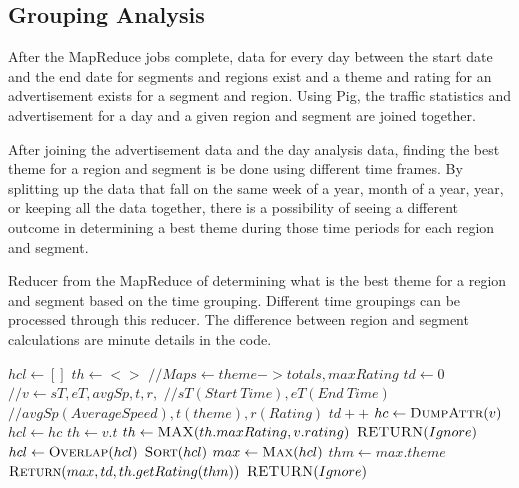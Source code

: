 \documentclass[titlepage,twocolumn]{article}
\begin{document}
\subsection{Grouping Analysis}
\label{sub:grpAnalysis}

\par After the MapReduce jobs complete, data for every day between the start date and the end date for segments and regions exist and a theme and rating for an advertisement exists for a segment and region. Using Pig, the traffic statistics and advertisement for a day and a given region and segment are joined together. 

\par After joining the advertisement data and the day analysis data, finding the best theme for a region and segment is be done using different time frames. By splitting up the data that fall on the same week of a year, month of a year, year, or keeping all the data together, there is a possibility of seeing a different outcome in determining a best theme during those time periods for each region and segment. 

\begin{algorithm}
	\small
	\caption{\small Reducer from the MapReduce of determining what is the best theme for a region and segment based on the time grouping. Different time groupings can be processed through this reducer. The difference between region and segment calculations are minute details in the code.}
	\label{alg:5}
	\begin{algorithmic}[1]
		\State $ hcl \gets [] $ 
		\State $ th \gets <> $ 
		\State $ // Maps \gets theme -> totals, maxRating $
		\State $ td \gets 0 $ 
			\State $ // v \gets sT, eT, avgSp, t, r, $
			\State $ // sT (Start\ Time), eT (End\ Time) $
			\State $ // avgSp (Average Speed), t (theme), r (Rating) $
			\State $ td++ $
				\State $ hc \gets \Call{DumpAttr}{v} $
				\State $ hcl \gets hc $
				\State $ th \gets v.t $
				\State $ th \gets \Call{MAX}{th.maxRating, v.rating} $
			\EndIf
		\EndFor
			\State $ \Call{RETURN}{Ignore} $
		\EndIf
		\State $ hcl \gets \Call{Overlap}{hcl} $ 
			\State $ \Call{Sort}{hcl} $
			\State $ max \gets \Call{Max}{hcl} $
			\State $ thm \gets max.theme $
			\State $ \Call{Return}{max, td, th.getRating(thm)} $
		\EndIf
		\State $ \Call{RETURN}{Ignore} $
		
		\EndProcedure
	\end{algorithmic}
\end{algorithm}
\end{document}

